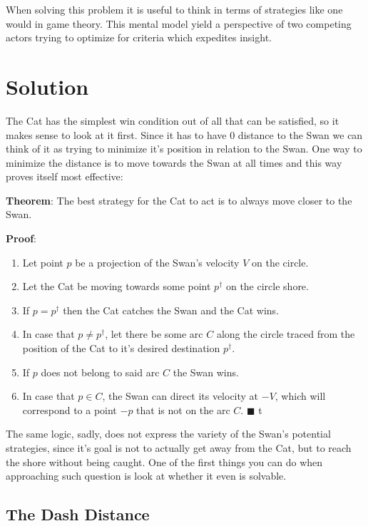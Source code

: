 \documentclass[12pt]{article}
\begin{document}
When solving this problem it is useful to think in terms of strategies like one would in game theory. This mental model yield a perspective of two competing actors trying to optimize for criteria which expedites insight. 

\section{Solution}

The Cat has the simplest win condition out of all that can be satisfied, so it makes sense to look at it first. Since it has to have 0 distance to the Swan we can think of it as trying to minimize it's position in relation to the Swan. One way to minimize the distance is to move towards the Swan at all times and this way proves itself most effective:

\textbf{Theorem}: The best strategy for the Cat to act is to always move closer to the Swan.

\textbf{Proof}:
\begin{enumerate}
	\item Let point $p$ be a projection of the Swan's velocity $V$ on the circle.
	\item Let the Cat be moving towards some point $p^\dagger$ on the circle shore.
	\item If $p = p^\dagger$ then the Cat catches the Swan and the Cat wins. 
	\item In case that $p \neq p^\dagger$, let there be some arc $C$ along the circle traced from the position of the Cat to it's desired destination $p^\dagger$.
	\item If $p$ does not belong to said arc $C$ the Swan wins.
	\item In case that $p \in C$, the Swan can direct its velocity at $-V$, which will correspond to a point $-p$ that is not on the arc $C$. $\blacksquare$
t\end{enumerate}

The same logic, sadly, does not express the variety of the Swan's potential strategies, since it's goal is not to actually get away from the Cat, but to reach the shore without being caught. One of the first things you can do when approaching such question is look at whether it even is solvable.

\subsection{The Dash Distance}
\end{document}
